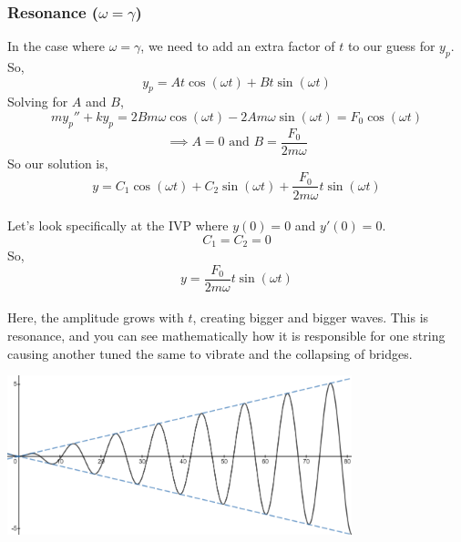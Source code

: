 \subsubsection{Resonance ($\omega = \gamma$)}
\noindent
In the case where $\omega = \gamma$, we need to add an extra factor of $t$ to our guess for $y_p$. So,
\begin{equation*}
	y_p = At\cos{(\omega t)} + Bt\sin{(\omega t)}
\end{equation*}
Solving for $A$ and $B$,
\begin{equation*}
	my_p'' + ky_p = 2Bm\omega\cos{(\omega t)} - 2Am\omega\sin{(\omega t)} = F_0\cos{(\omega t)}
\end{equation*}
\begin{equation*}
	\implies A = 0 \text{ and } B = \frac{F_0}{2m\omega}
\end{equation*}
So our solution is,
\begin{equation*}
	y = C_1\cos{(\omega t)} + C_2\sin{(\omega t)} + \frac{F_0}{2m\omega}t\sin{(\omega t)}
\end{equation*}\\

\noindent
Let's look specifically at the IVP where $y(0) = 0$ and $y'(0) = 0$.
\begin{equation*}
	C_1 = C_2 = 0
\end{equation*}
So,
\begin{equation*}
	y = \frac{F_0}{2m\omega}t\sin{(\omega t)}
\end{equation*}\\

\noindent
Here, the amplitude grows with $t$, creating bigger and bigger waves. This is resonance, and you can see mathematically how it is responsible for one string causing another tuned the same to vibrate and the collapsing of bridges.

\begin{center}
	\includegraphics[width=0.75\textwidth]{./higherOrder/forcedVibrs/resonance.png}
\end{center}